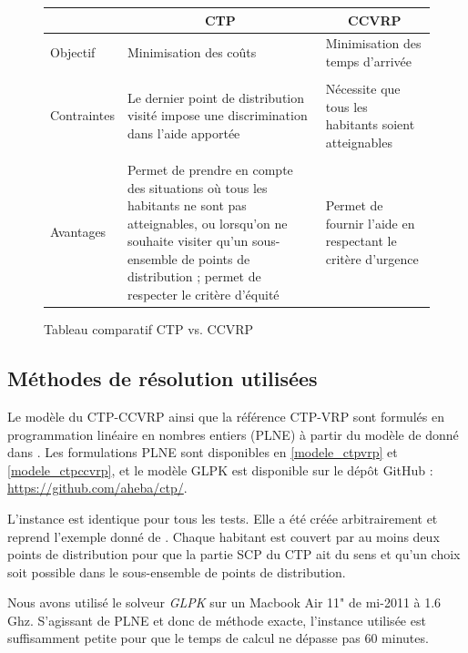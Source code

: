 \documentclass[5p,authoryear,square]{elsarticle}
\begin{document}
\begin{figure}
\centering \begin{tabular}{p{2cm} p{8cm} p{6cm}} \toprule
& \multicolumn{1}{c}{CTP} & \multicolumn{1}{c}{CCVRP} \\ \midrule
Objectif & Minimisation des coûts & Minimisation des temps d'arrivée \\ \\
Contraintes & Le dernier point de distribution visité impose une discrimination dans l'aide apportée & Nécessite que tous les habitants soient atteignables  \\  \\ 
Avantages & Permet de prendre en compte des situations où tous les habitants ne sont pas atteignables, ou lorsqu'on ne souhaite visiter qu'un sous-ensemble de points de distribution ; permet de respecter le critère d'équité & Permet de fournir l'aide en respectant le critère d'urgence \\ \bottomrule
\end{tabular} \caption{Tableau comparatif CTP vs. CCVRP} \label{comparatif}
\end{figure}

\subsection{Méthodes de résolution utilisées}
Le modèle du CTP-CCVRP ainsi que la référence CTP-VRP sont formulés en programmation linéaire en nombres entiers (PLNE) à partir du modèle de donné dans \cite{naji-azimi_covering_2012}. Les formulations PLNE sont disponibles en \cref{modele_ctpvrp} et \cref{modele_ctpccvrp}, et le modèle GLPK est disponible sur le dépôt GitHub : \url{https://github.com/aheba/ctp/}.

L'instance est identique pour tous les tests. Elle a été créée arbitrairement et reprend l'exemple donné de \cite{naji-azimi_covering_2012}. Chaque habitant est couvert par au moins deux points de distribution pour que la partie SCP du CTP ait du sens et qu'un choix soit possible dans le sous-ensemble de points de distribution.

Nous avons utilisé le solveur \emph{GLPK} sur un Macbook Air 11" de mi-2011 à 1.6 Ghz. S'agissant de PLNE et donc de méthode exacte, l'instance utilisée est suffisamment petite pour que le temps de calcul ne dépasse pas 60 minutes.
\end{document}
